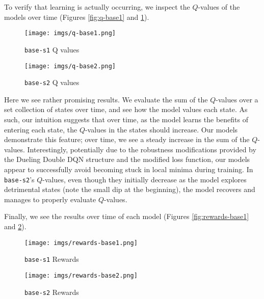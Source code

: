 \documentclass{article} %
\begin{document}
To verify that learning is actually occurring, we inspect the $Q$-values of the models over time
(Figures \ref{fig:q-base1} and \ref{fig:q-base2}).
\begin{figure}
    \centering
    \begin{minipage}{0.45\textwidth}
        \centering
        \texttt{[image: imgs/q-base1.png]} %
        \caption{\texttt{base-s1} Q values}
        \label{fig:q-base1}
    \end{minipage}\hfill
    \begin{minipage}{0.45\textwidth}
        \centering
        \texttt{[image: imgs/q-base2.png]} %
        \caption{\texttt{base-s2} Q values}
        \label{fig:q-base2}
    \end{minipage}
\end{figure}

Here we see rather promising results. We evaluate the sum of the $Q$-values over a set collection of
states over time, and see how the model values each state. As such, our intuition suggests that over
time, as the model learns the benefits of entering each state, the $Q$-values in the states should
increase. Our models demonstrate this feature; over time, we see a steady increase in the sum of the
$Q$-values. Interestingly, potentially due to the robustness modifications provided by the Dueling
Double DQN structure and the modified loss function, our models appear to successfully avoid
becoming stuck in local minima during training. In \texttt{base-s2}'s $Q$-values, even though they
initially decrease as the model explores detrimental states (note the small dip at the beginning),
the model recovers and manages to properly evaluate $Q$-values.

Finally, we see the results over time of each model (Figures \ref{fig:rewards-base1} and
\ref{fig:rewards-base2}).
\begin{figure}
    \centering
    \begin{minipage}{0.45\textwidth}
        \centering
        \texttt{[image: imgs/rewards-base1.png]} %
        \caption{\texttt{base-s1} Rewards}
        \label{fig:rewards-base1}
    \end{minipage}\hfill
    \begin{minipage}{0.45\textwidth}
        \centering
        \texttt{[image: imgs/rewards-base2.png]} %
        \caption{\texttt{base-s2} Rewards}
        \label{fig:rewards-base2}
    \end{minipage}
\end{figure}
\end{document}
